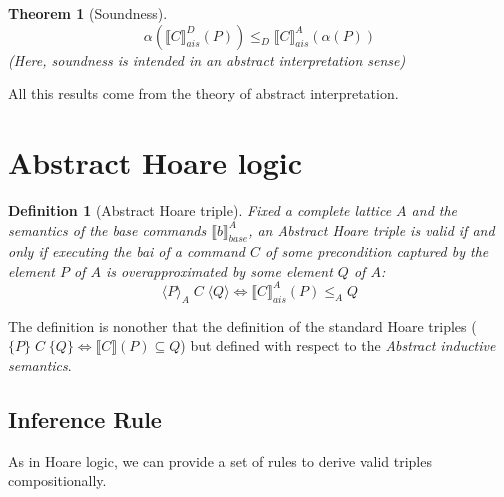 \documentclass{article}
\newtheorem{definition}{Definition}
\newtheorem{theorem}{Theorem}
\newcommand{\htriple}[3]{
    \{ #1 \} \; #2 \; \{ #3 \}
}
\newcommand{\atriple}[4][A]{
    \langle #2 \rangle_{#1} \; #3 \; \langle #4 \rangle
}
\newcommand*{\sem}[1]{
    \llbracket #1 \rrbracket
}
\newcommand{\bca}[2]{
    #2_{ais}^{#1}
}
\newcommand{\bsem}[2][A]{
    \bca{#1}{\sem{#2}}
}
\newcommand{\basesem}[2][A]{
    \sem{#2}_{base}
}
\begin{document}
\begin{theorem}[Soundness]
    $$\alpha(\bsem[D]{C}(P)) \leq_D \bsem[A]{C}(\alpha(P))$$
    (Here, soundness is intended in an abstract interpretation sense)
\end{theorem}

All this results come from the theory of abstract interpretation.

\section{Abstract Hoare logic}
    

    \begin{definition}[Abstract Hoare triple]
        Fixed a complete lattice $A$ and the semantics of the base commands 
        $\basesem{b}^A$, an \textit{Abstract Hoare triple} is valid if and only if 
        executing the bai of a command $C$ of some precondition captured by the
        element $P$ of $A$ is overapproximated by some element $Q$ of $A$:
        $$\atriple{P}{C}{Q} \iff \bsem{C}(P) \leq_A Q$$
    \end{definition}

    The definition is nonother that the definition of the standard Hoare triples
    ($\htriple{P}{C}{Q} \iff \sem{C}(P) \subseteq Q$) but defined with respect
    to the \textit{Abstract inductive semantics}.


    \subsection{Inference Rule}
    As in Hoare logic, we can provide a set of rules to derive valid triples 
    compositionally.
\end{document}
